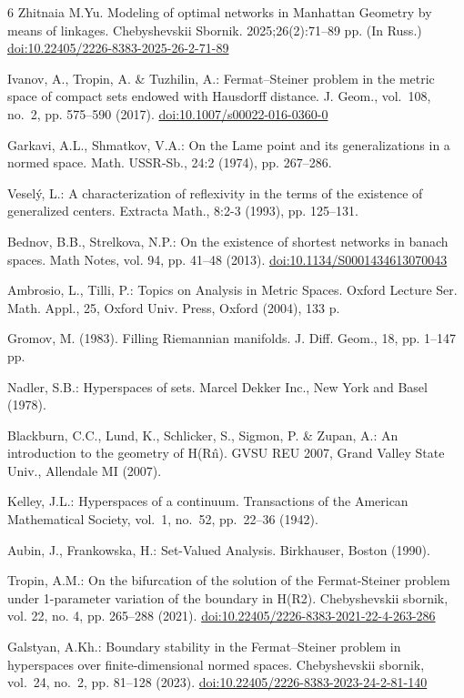 \documentclass{svproc}
\begin{document}
\begin{thebibliography}{6}
 Zhitnaia M.Yu. Modeling of optimal networks in Manhattan Geometry by means of linkages. Chebyshevskii Sbornik. 2025;26(2):71--89 pp. (In Russ.) 
\url{doi:10.22405/2226-8383-2025-26-2-71-89}

 Ivanov, A., Tropin, A. \& Tuzhilin, A.: Fermat--Steiner problem in the metric space of compact sets endowed with Hausdorff distance. J. Geom., vol.~108, no.~2, pp. 575--590 (2017).
\url{doi:10.1007/s00022-016-0360-0}

 Garkavi, A.L., Shmatkov, V.A.: On the Lame point and its generalizations in a normed space. Math. USSR-Sb., 24:2 (1974), pp. 267--286.

 Vesel\'{y}, L.: A characterization of reflexivity in the terms of the existence of generalized centers. Extracta Math., 8:2-3 (1993), pp. 125--131.

 Bednov, B.B., Strelkova, N.P.: On the existence of shortest networks in banach spaces. Math Notes, vol. 94, pp. 41--48 (2013). 
\url{doi:10.1134/S0001434613070043}

 Ambrosio, L., Tilli, P.: Topics on Analysis in Metric Spaces. Oxford Lecture Ser. Math. Appl., 25, Oxford Univ. Press, Oxford (2004), 133 p.

 Gromov, M. (1983). Filling Riemannian manifolds. J. Diff. Geom., 18, pp. 1--147 pp.

 Nadler, S.B.: Hyperspaces of sets. Marcel Dekker Inc., New York and Basel (1978).

 Blackburn, C.C., Lund, K., Schlicker, S., Sigmon, P. \& Zupan, A.: An introduction to the geometry of H(R\^n). GVSU REU 2007, Grand Valley State Univ., Allendale MI (2007).

 Kelley, J.L.: Hyperspaces of a continuum. Transactions of the American Mathematical Society, vol.~1, no.~52, pp.~22--36 (1942).

 Aubin, J., Frankowska, H.: Set-Valued Analysis. Birkhauser, Boston (1990).

 Tropin, A.M.: On the bifurcation of the solution of the Fermat-Steiner problem under 1-parameter variation of the boundary in H(R2). Chebyshevskii sbornik, vol. 22, no. 4, pp. 265--288 (2021).
\url{doi:10.22405/2226-8383-2021-22-4-263-286}

 Galstyan, A.Kh.: Boundary stability in the Fermat--Steiner problem in hyperspaces over finite-dimensional normed spaces. Chebyshevskii sbornik, vol.~24, no.~2, pp. 81--128 (2023).
\url{doi:10.22405/2226-8383-2023-24-2-81-140}


\end{thebibliography}
\end{document}
